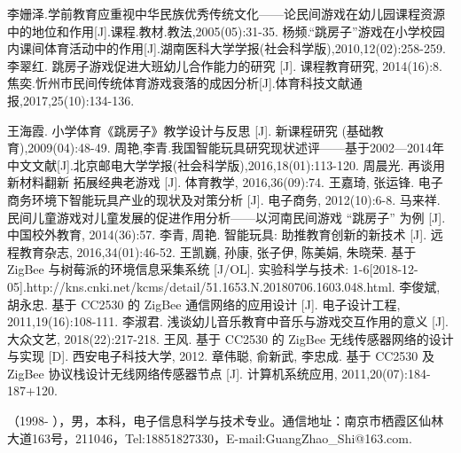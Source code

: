 \documentclass[a4paper,11pt,onecolumn,twoside]{article}
\begin{document}
\small
\begin{thebibliography}{99}
\setlength{\parskip}{0pt}  %
李姗泽.学前教育应重视中华民族优秀传统文化——论民间游戏在幼儿园课程资源中的地位和作用[J].课程.教材.教法,2005(05):31-35.
杨频.“跳房子”游戏在小学校园内课间体育活动中的作用[J].湖南医科大学学报(社会科学版),2010,12(02):258-259.
李翠红. 跳房子游戏促进大班幼儿合作能力的研究 [J]. 课程教育研究, 2014(16):8.
焦奕.忻州市民间传统体育游戏衰落的成因分析[J].体育科技文献通报,2017,25(10):134-136.

王海霞. 小学体育《跳房子》教学设计与反思 [J]. 新课程研究 (基础教育),2009(04):48-49.
周艳,李青.我国智能玩具研究现状述评——基于2002—2014年中文文献[J].北京邮电大学学报(社会科学版),2016,18(01):113-120.
周晨光. 再谈用新材料翻新 拓展经典老游戏 [J]. 体育教学, 2016,36(09):74.
王嘉琦, 张运锋. 电子商务环境下智能玩具产业的现状及对策分析 [J]. 电子商务, 2012(10):6-8.
马来祥. 民间儿童游戏对儿童发展的促进作用分析——以河南民间游戏 “跳房子” 为例 [J]. 中国校外教育, 2014(36):57.
李青, 周艳. 智能玩具: 助推教育创新的新技术 [J]. 远程教育杂志, 2016,34(01):46-52.
王凯巍, 孙康, 张子伊, 陈美娟, 朱晓荣. 基于 ZigBee 与树莓派的环境信息采集系统 [J/OL]. 实验科学与技术: 1-6[2018-12-05].http://kns.cnki.net/kcms/detail/51.1653.N.20180706.1603.048.html.
李俊斌, 胡永忠. 基于 CC2530 的 ZigBee 通信网络的应用设计 [J]. 电子设计工程, 2011,19(16):108-111.
李淑君. 浅谈幼儿音乐教育中音乐与游戏交互作用的意义 [J]. 大众文艺, 2018(22):217-218.
王风. 基于 CC2530 的 ZigBee 无线传感器网络的设计与实现 [D]. 西安电子科技大学, 2012.
章伟聪, 俞新武, 李忠成. 基于 CC2530 及 ZigBee 协议栈设计无线网络传感器节点 [J]. 计算机系统应用, 2011,20(07):184-187+120.






\end{thebibliography}
{

（1998- ），男，本科，电子信息科学与技术专业。通信地址：南京市栖霞区仙林大道163号，211046，Tel:18851827330，E-mail:GuangZhao\_Shi@163.com.
}

\end{document}
